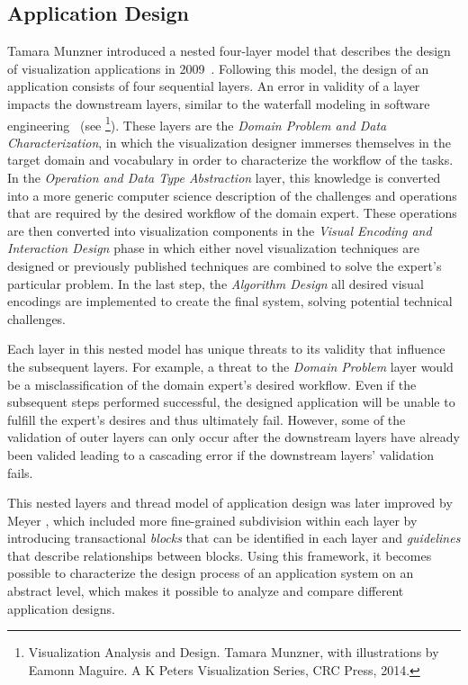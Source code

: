 \subsection{Application Design} \label{cha:intro:appl:design}
Tamara Munzner introduced a nested four-layer model that describes the design of visualization applications in 2009~\cite{munzner2009nested}.  Following this model, the design of an application consists of four sequential layers.  An error in validity of a layer impacts the downstream layers, similar to the waterfall modeling in software engineering~\cite{royce1987managing} (see \footnote{Visualization Analysis and Design. Tamara Munzner, with illustrations by Eamonn Maguire. A K Peters Visualization Series, CRC Press, 2014.}).  These layers are the \emph{Domain Problem and Data Characterization}, in which the visualization designer immerses themselves in the target domain and vocabulary in order to characterize the workflow of the tasks.  In the \emph{Operation and Data Type Abstraction} layer, this knowledge is converted into a more generic computer science description of the challenges and operations that are required by the desired workflow of the domain expert.  These operations are then converted into visualization components in the \emph{Visual Encoding and Interaction Design} phase in which either novel visualization techniques are designed or previously published techniques are combined to solve the expert's particular problem.  In the last step, the \emph{Algorithm Design} all desired visual encodings are implemented to create the final system, solving potential technical challenges.

Each layer in this nested model has unique threats to its validity that influence the subsequent layers.  For example, a threat to the \emph{Domain Problem} layer would be a misclassification of the domain expert's desired workflow.  Even if the subsequent steps performed successful, the designed application will be unable to fulfill the expert's desires and thus ultimately fail.  However, some of the validation of outer layers can only occur after the downstream layers have already been valided leading to a cascading error if the downstream layers' validation fails.

This nested layers and thread model of application design was later improved by Meyer \etal , which included more fine-grained subdivision within each layer by introducing transactional \emph{blocks} that can be identified in each layer and \emph{guidelines} that describe relationships between blocks.  Using this framework, it becomes possible to characterize the design process of an application system on an abstract level, which makes it possible to analyze and compare different application designs.



